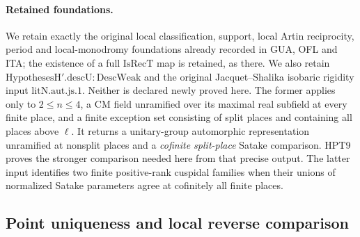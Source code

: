 \documentclass[11pt,a4paper]{article}
\numberwithin{equation}{section}
\theoremstyle{remark}\newtheorem{remark}[theorem]{Remark}
\begin{document}
\paragraph{Retained foundations.}
We retain exactly the original local classification, support,
local Artin reciprocity, period and local-monodromy foundations
already recorded in GUA, OFL and ITA; the existence of a full
$\mathrm{IsRecT}$ map is retained, as there.  We also retain
$\mathrm{HypothesesH}'.\mathrm{descU}:\mathrm{DescWeak}$ and the
original Jacquet--Shalika isobaric rigidity input
$\mathrm{litN.aut.js}.1$.  Neither is declared newly proved here.
The former applies only to $2\leq n\leq4$, a CM field unramified
over its maximal real subfield at every finite place, and a finite
exception set consisting of split places and containing all places
above $\ell$.  It returns a unitary-group automorphic representation
unramified at nonsplit places and a \emph{cofinite split-place}
Satake comparison.  HPT9 proves the stronger comparison needed here
from that precise output.  The latter input identifies two finite
positive-rank cuspidal families when their unions of normalized
Satake parameters agree at cofinitely all finite places.

\subsection{Point uniqueness and local reverse comparison}

\end{document}
